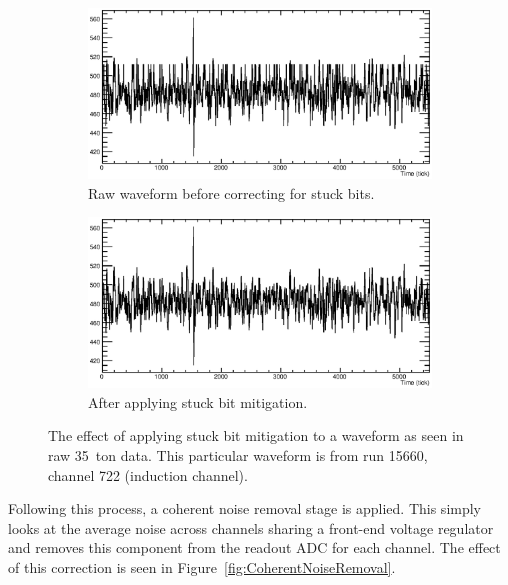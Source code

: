 \begin{figure}
  \centering
  \begin{subfigure}[t]{0.48\linewidth}
    \centering
    \includegraphics[width=\textwidth]{raw_stuck.eps}
    \caption{Raw waveform before correcting for stuck bits.}
    \label{fig:StuckBitWaveformStuck}
  \end{subfigure}
  \hfill
  \begin{subfigure}[t]{0.48\linewidth}
    \centering
    \includegraphics[width=\textwidth]{raw_unstuck.eps}
    \caption{After applying stuck bit mitigation.}
    \label{fig:StuckBitWaveformUnstuck}
  \end{subfigure}
  \caption[The effect of applying stuck bit mitigation to a waveform as seen in raw 35~ton data.]{The effect of applying stuck bit mitigation to a waveform as seen in raw 35~ton data.  This particular waveform is from run 15660, channel 722 (induction channel).}
  \label{fig:StuckBitWaveform}
\end{figure}

Following this process, a coherent noise removal stage is applied.  This simply looks at the average noise across channels sharing a front-end voltage regulator and removes this component from the readout ADC for each channel.  The effect of this correction is seen in Figure~\ref{fig:CoherentNoiseRemoval}.

